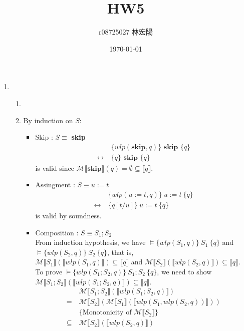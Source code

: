 \documentclass[11pt]{article}
\title{HW5}
\author{r08725027 林宏陽}
\date{\today}
\begin{document}
	\maketitle
	\begin{enumerate}
	\item 
		\begin{enumerate}
			\item ~
			\item By induction on $S$:
			\begin{itemize}
				\item Skip : $S\equiv$ \textbf{skip}
					\begin{align*}
						&\{wlp(\textbf{skip}, q)\}\textbf{ skip }\{q\}\\
						\leftrightarrow~ & \{q\}\textbf{ skip }\{q\}
					\end{align*}
					is valid since $\mathcal{M}\llbracket\textbf{skip}\rrbracket(q) = \emptyset \subseteq \llbracket q\rrbracket$.
				\item Assingment : $S\equiv u:=t$
					\begin{align*}
						&\{wlp(u:=t, q)\}~u:=t~\{q\}\\
						\leftrightarrow~ & \{q[t/u]\}~u:=t~\{q\}
					\end{align*}
					is valid by soundness.
				\item Composition : $S\equiv S_{1};S_{2}$\\
					From induction hypothesis, we have $\models \{wlp(S_{1}, q)\}~S_{1}~\{q\}$ and $\models \{wlp(S_{2}, q)\}~S_{2}~\{q\}$, that is,\\ $\mathcal{M}\llbracket S_{1} \rrbracket (\llbracket wlp(S_{1}, q) \rrbracket) \subseteq \llbracket q \rrbracket$ and $\mathcal{M}\llbracket S_{2} \rrbracket (\llbracket wlp(S_{2}, q) \rrbracket) \subseteq \llbracket q \rrbracket$.\\ To prove $\models \{wlp(S_{1};S_{2},q)\}~S_{1};S_{2}~\{q\}$, we need to show $\mathcal{M}\llbracket S_{1};S_{2}\rrbracket(\llbracket wlp(S_{1};S_{2}, q)\rrbracket) \subseteq \llbracket q \rrbracket$.
					\begin{align*}
						&\mathcal{M}\llbracket S_{1};S_{2}\rrbracket(\llbracket wlp(S_{1};S_{2}, q)\rrbracket)\\
						=~ & \mathcal{M}\llbracket S_{2}\rrbracket(\mathcal{M}\llbracket S_{1}\rrbracket(\llbracket wlp(S_{1}, wlp(S_{2}, q)) \rrbracket))\\
						&\{\text{Monotonicity of }\mathcal{M}\llbracket S_{2} \rrbracket\}\\
						\subseteq~ & \mathcal{M}\llbracket S_{2} \rrbracket(\llbracket wlp(S_{2}, q) \rrbracket)\\

\end{align*}
\end{itemize}
\end{enumerate}
\end{enumerate}
\end{document}
